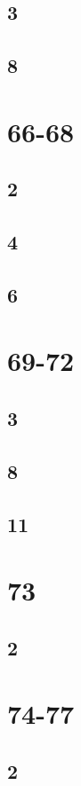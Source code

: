 \documentclass{article}
\begin{document}
\subsection*{3}
\subsection*{8}

\section*{66-68}
\subsection*{2}
\subsection*{4}
\subsection*{6}

\section*{69-72}
\subsection*{3}
\subsection*{8}
\subsection*{11}

\section*{73}
\subsection*{2}

\section*{74-77}
\subsection*{2}
\end{document}
